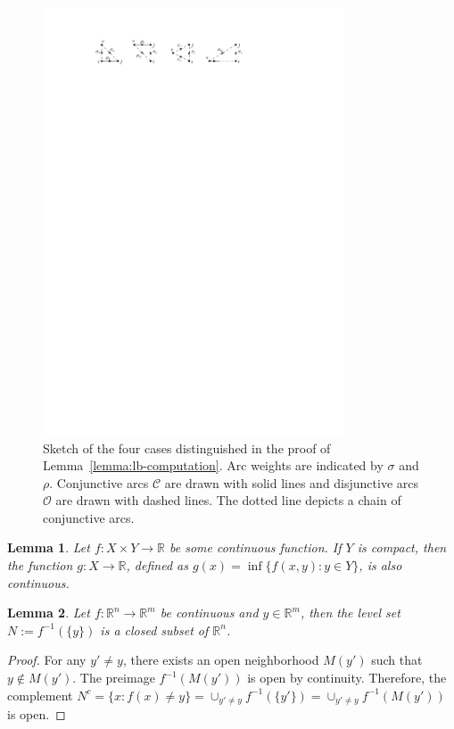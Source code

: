 \documentclass[a4paper]{report}
\theoremstyle{definition}
\theoremstyle{plain}
\newtheorem{lemma}{Lemma}[chapter]
\begin{document}
\begin{figure}
  \centering
  \includegraphics[width=0.8\textwidth]{figures/single/lower-bound-lemma.pdf}
  \caption{Sketch of the four cases distinguished in the proof of Lemma~\ref{lemma:lb-computation}. Arc
    weights are indicated by $\sigma$ and $\rho$. Conjunctive arcs $\mathcal{C}$ are
    drawn with solid lines and disjunctive arcs $\mathcal{O}$ are drawn with
    dashed lines. The dotted line depicts a chain of conjunctive arcs.}\label{fig:lb-computation}
\end{figure}

\begin{lemma}\label{lemma:inf-continuous}
  Let $f : X \times Y \rightarrow \mathbb{R}$ be some continuous function. If
  $Y$ is compact, then the function $g : X \rightarrow \mathbb{R}$, defined as
  $g(x) = \inf \{ f(x,y) : y\in Y\}$, is also continuous.
\end{lemma}

\begin{lemma}\label{lemma:levelset}
  Let $f :\mathbb{R}^{n} \rightarrow \mathbb{R}^{m}$ be continuous and
  $y \in \mathbb{R}^{m}$, then the level set $N := f^{-1}(\{ y \})$ is a closed
  subset of $\mathbb{R}^{n}$.
\end{lemma}
\begin{proof}
  For any $y' \neq y$, there exists an open neighborhood $M(y')$ such that
  $y \notin M(y')$. The preimage $f^{-1}(M(y'))$ is open by continuity.
  Therefore, the complement
  $N^{c} = \{ x : f(x) \neq y \} = \cup_{y' \neq y} f^{-1}(\{y'\}) = \cup_{y' \neq y} f^{-1}(M(y'))$
  is open.
\end{proof}
\end{document}
